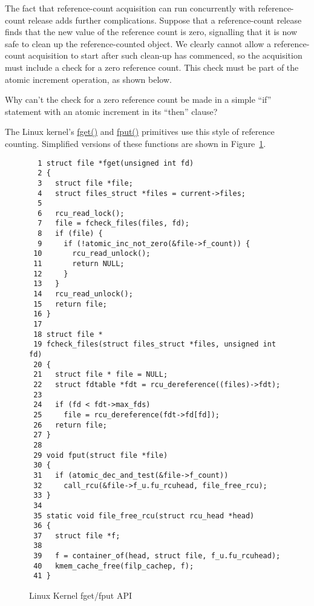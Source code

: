 The fact that reference-count acquisition can run concurrently
with reference-count release adds further complications.
Suppose that a reference-count release finds that the new
value of the reference count is zero, signalling that it is
now safe to clean up the reference-counted object.
We clearly cannot allow a reference-count acquisition to
start after such clean-up has commenced, so the acquisition
must include a check for a zero reference count.
This check must be part of the atomic increment operation,
as shown below.

\QuickQuiz{}
	Why can't the check for a zero reference count be
	made in a simple ``if'' statement with an atomic
	increment in its ``then'' clause?
 \QuickQuizEnd

The Linux kernel's \url{fget()} and \url{fput()} primitives
use this style of reference counting.
Simplified versions of these functions are shown in
Figure~\ref{fig:defer:Linux Kernel fget/fput API}.

\begin{figure}[htbp]
{ \scriptsize
\begin{verbatim}
  1 struct file *fget(unsigned int fd)
  2 {
  3   struct file *file;
  4   struct files_struct *files = current->files;
  5 
  6   rcu_read_lock();
  7   file = fcheck_files(files, fd);
  8   if (file) {
  9     if (!atomic_inc_not_zero(&file->f_count)) {
 10       rcu_read_unlock();
 11       return NULL;
 12     }
 13   }
 14   rcu_read_unlock();
 15   return file;
 16 }
 17 
 18 struct file *
 19 fcheck_files(struct files_struct *files, unsigned int fd)
 20 {
 21   struct file * file = NULL;
 22   struct fdtable *fdt = rcu_dereference((files)->fdt);
 23 
 24   if (fd < fdt->max_fds)
 25     file = rcu_dereference(fdt->fd[fd]);
 26   return file;
 27 }
 28 
 29 void fput(struct file *file)
 30 {
 31   if (atomic_dec_and_test(&file->f_count))
 32     call_rcu(&file->f_u.fu_rcuhead, file_free_rcu);
 33 }
 34 
 35 static void file_free_rcu(struct rcu_head *head)
 36 {
 37   struct file *f;
 38   
 39   f = container_of(head, struct file, f_u.fu_rcuhead);
 40   kmem_cache_free(filp_cachep, f);
 41 }
\end{verbatim}
}
\caption{Linux Kernel fget/fput API}
\label{fig:defer:Linux Kernel fget/fput API}
\end{figure}

